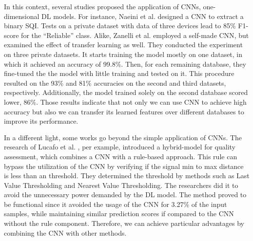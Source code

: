 In this context, several studies proposed the application of \gls{CNN}s, one-dimensional \gls{DL} models. For instance, Naeini et al. \cite{deep-learning-1} designed a \gls{CNN} to extract a binary \gls{SQI}. Tests on a private dataset with data of three devices lead to 85\% F1-score for the ``Reliable'' class. Alike, Zanelli et al. \cite{deep-learning-2} employed a self-made \gls{CNN}, but examined the effect of transfer learning as well. They conducted the experiment on three private datasets. It starts training the model mostly on one dataset, in which it achieved an accuracy of 99.8\%. Then, for each remaining database, they fine-tuned the the model with little training and tested on it. This procedure resulted on the 93\% and 81\% accuracies on the second and third datasets, respectively. Additionally, the model trained solely on the second database scored lower, 86\%. Those results indicate that not only we can use \gls{CNN} to achieve high accuracy but also we can transfer its learned features over different databases to improve its performance.

In a different light, some works go beyond the simple application of \gls{CNN}s. The research of Lucafo et al. \cite{deep-learning-3}, per example, introduced a hybrid-model for quality assessment, which combines a \gls{CNN} with a rule-based approach. This rule can bypass the utilization of the \gls{CNN} by verifying if the signal min to max distance is less than an threshold. They determined the threshold by methods such as Last Value Thresholding and Nearest Value Thresholding. The researchers did it to avoid the unnecessary power demanded by the \gls{DL} model. The method proved to be functional since it avoided the usage of the \gls{CNN} for 3.27\% of the input samples, while maintaining similar prediction scores if compared to the \gls{CNN} without the rule component. Therefore, we can achieve particular advantages by combining the \gls{CNN} with other methods.  

